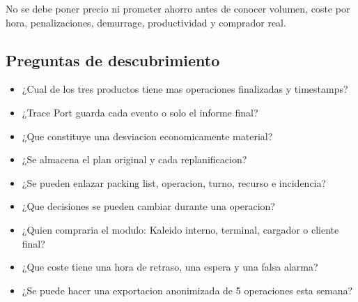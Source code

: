 \documentclass[
  spanish,
  10pt,
  a4paper,
]{article}
\providecommand{\tightlist}{%
  \setlength{\itemsep}{0pt}\setlength{\parskip}{0pt}}
\begin{document}
No se debe poner precio ni prometer ahorro antes de conocer volumen,
coste por hora, penalizaciones, demurrage, productividad y comprador
real.

\subsection{Preguntas de
descubrimiento}\label{preguntas-de-descubrimiento}

\begin{itemize}
\tightlist
\item
  ¿Cual de los tres productos tiene mas operaciones finalizadas y
  timestamps?
\item
  ¿Trace Port guarda cada evento o solo el informe final?
\item
  ¿Que constituye una desviacion economicamente material?
\item
  ¿Se almacena el plan original y cada replanificacion?
\item
  ¿Se pueden enlazar packing list, operacion, turno, recurso e
  incidencia?
\item
  ¿Que decisiones se pueden cambiar durante una operacion?
\item
  ¿Quien compraria el modulo: Kaleido interno, terminal, cargador o
  cliente final?
\item
  ¿Que coste tiene una hora de retraso, una espera y una falsa alarma?
\item
  ¿Se puede hacer una exportacion anonimizada de 5 operaciones esta
  semana?
\end{itemize}
\end{document}
